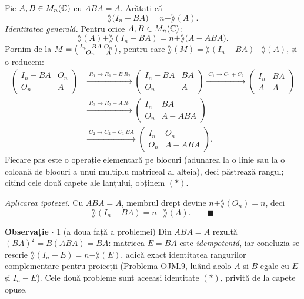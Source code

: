 Fie $A,B \in M_n(\mathbb{C})$ cu $ABA = A$. Arătați că
\[
    \rang\bigl(I_n - BA\bigr) = n - \rang(A).
\]
\sol \textit{Identitatea generală.} Pentru orice $A,B \in M_n(\mathbb{C})$:
\[
    \rang(A) + \rang(I_n - BA) = n + \rang\bigl(A - ABA\bigr).
    \tag{$*$}
\]
Pornim de la $M = \begin{psmallmatrix} I_n - BA & O_n \\ O_n & A \end{psmallmatrix}$,
pentru care $\rang(M) = \rang(I_n - BA) + \rang(A)$, și o reducem:
\[
\begin{aligned}
\begin{pmatrix} I_n - BA & O_n \\ O_n & A \end{pmatrix}
&\xrightarrow{\;R_1 \to R_1 + B\,R_2\;}
\begin{pmatrix} I_n - BA & BA \\ O_n & A \end{pmatrix}
\xrightarrow{\;C_1 \to C_1 + C_2\;}
\begin{pmatrix} I_n & BA \\ A & A \end{pmatrix} \\[2mm]
&\xrightarrow{\;R_2 \to R_2 - A\,R_1\;}
\begin{pmatrix} I_n & BA \\ O_n & A - ABA \end{pmatrix}\\[2mm]
&\xrightarrow{\;C_2 \to C_2 - C_1\,BA\;}
\begin{pmatrix} I_n & O_n \\ O_n & A - ABA \end{pmatrix}.
\end{aligned}
\]
Fiecare pas este o operație elementară pe blocuri (adunarea la o linie sau la o coloană
de blocuri a unui multiplu matriceal al alteia), deci păstrează rangul; citind cele două
capete ale lanțului, obținem $(*)$.

\textit{Aplicarea ipotezei.} Cu $ABA = A$, membrul drept devine
$n + \rang(O_n) = n$, deci
\[
    \rang(I_n - BA) = n - \rang(A). \qquad \blacksquare
\]

\medskip
\noindent\textbf{Observație} $\cdot$ 1 (a doua față a problemei)\quad
Din $ABA = A$ rezultă $(BA)^2 = B(ABA) = BA$: matricea $E = BA$ este
\emph{idempotentă}, iar concluzia se rescrie $\rang(I_n - E) = n - \rang(E)$,
adică exact identitatea rangurilor complementare pentru proiecții
(Problema OJM.9, luând acolo $A$ și $B$ egale cu $E$ și $I_n - E$). Cele două
probleme sunt aceeași identitate $(*)$, privită de la capete opuse.

